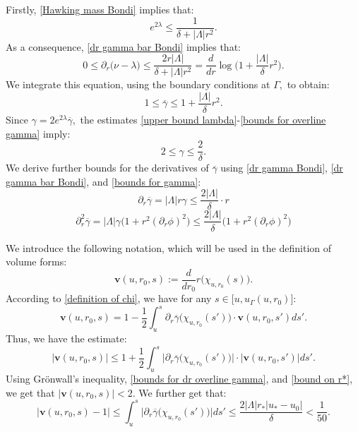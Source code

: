 \documentclass[11pt]{article}
\numberwithin{equation}{section}
\begin{document}
Firstly, \eqref{Hawking mass Bondi} implies that:
\begin{equation}\label{upper bound lambda}
    e^{2\lambda}\leq\frac{1}{\delta+|\Lambda|r^2}.
\end{equation}
As a consequence, \eqref{dr gamma bar Bondi} implies that:
\[0\leq\partial_r\big(\nu-\lambda\big)\leq\frac{2r|\Lambda|}{\delta+|\Lambda|r^2}=\frac{d}{dr}\log\bigg(1+\frac{|\Lambda|}{\delta}r^2\bigg).\]
We integrate this equation, using the boundary conditions at $\Gamma,$ to obtain:
\begin{equation}\label{bounds for overline gamma}
    1\leq\overline{\gamma}\leq1+\frac{|\Lambda|}{\delta}r^2.
\end{equation}
Since $\gamma=2e^{2\lambda}\overline{\gamma},$ the estimates \eqref{upper bound lambda}-\eqref{bounds for overline gamma} imply:
\begin{equation}\label{bounds for gamma}
    2\leq\gamma\leq\frac{2}{\delta}.
\end{equation}
We derive further bounds for the derivatives of $\overline{\gamma}$ using \eqref{dr gamma Bondi}, \eqref{dr gamma bar Bondi}, and \eqref{bounds for gamma}:
\begin{equation}\label{bounds for dr overline gamma}
    \partial_r\overline{\gamma}=|\Lambda|r\gamma\leq\frac{2|\Lambda|}{\delta}\cdot r
\end{equation}
\begin{equation}\label{bounds for dr^2 overline gamma}
    \partial_r^2\overline{\gamma}=|\Lambda|\gamma\Big(1+r^2(\partial_r\phi)^2\Big)\leq\frac{2|\Lambda|}{\delta}\Big(1+r^2(\partial_r\phi)^2\Big)
\end{equation}

We introduce the following notation, which will be used in the definition of volume forms:
\[\textbf{v}(u,r_0,s):=\frac{d}{dr_0}r\big(\chi_{u,r_0}(s)\big).\]
According to \eqref{definition of chi}, we have for any $s\in\big[u,u_{\Gamma}(u,r_0)\big]$:
\begin{equation}\label{volume form definition}
    \textbf{v}(u,r_0,s)=1-\frac{1}{2}\int_{u}^s\partial_r\overline{\gamma}\big(\chi_{u,r_0}(s')\big)\cdot\textbf{v}(u,r_0,s')ds'.
\end{equation}
Thus, we have the estimate:
\[\big|\textbf{v}(u,r_0,s)\big|\leq1+\frac{1}{2}\int_{u}^s\Big|\partial_r\overline{\gamma}\big(\chi_{u,r_0}(s')\big)\Big|\cdot\big|\textbf{v}(u,r_0,s')\big|ds'.\]
Using Grönwall's inequality, \eqref{bounds for dr overline gamma}, and \eqref{bound on r*}, we get that $\big|\textbf{v}(u,r_0,s)\big|<2.$ We further get that:
\begin{equation}\label{bound volume form}
\big|\textbf{v}(u,r_0,s)-1\big|\leq\int_{u}^s\Big|\partial_r\overline{\gamma}\big(\chi_{u,r_0}(s')\big)\Big|ds'\leq\frac{2|\Lambda|r_*|u_*-u_0|}{\delta}<\frac{1}{50}.
\end{equation}
\end{document}
